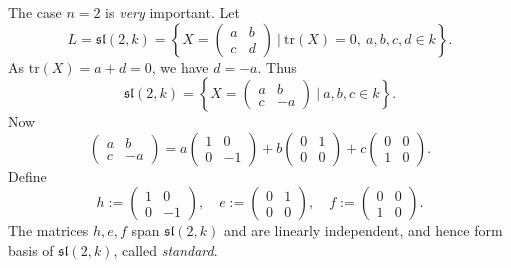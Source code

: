 The case $n = 2$ is \emph{very} important. Let
\[
	L = \mathfrak{sl}(2, k) = \left\{X =
	\begin{pmatrix}
		a & b \\
		c & d
	\end{pmatrix}
	\ |\ \text{tr}(X) = 0,\ a, b, c, d \in k
	\right\}.
\]
As $\text{tr}(X) = a + d = 0$, we have $d = -a$. Thus
\[
	\mathfrak{sl}(2, k) = \left\{X =
	\begin{pmatrix}
		a & b \\
		c & -a
	\end{pmatrix}
	\ |\ a, b, c \in k
	\right\}.
\]
Now
\[
	\begin{pmatrix}
		a & b \\
		c & -a
	\end{pmatrix}
	=
	a\begin{pmatrix}
		1 & 0 \\
		0 & -1
	\end{pmatrix}
	+
	b\begin{pmatrix}
		0 & 1 \\
		0 & 0
	\end{pmatrix}
	+
	c\begin{pmatrix}
		0 & 0 \\
		1 & 0
	\end{pmatrix}.
\]
Define
\[
	h :=
	\begin{pmatrix}
		1 & 0 \\
		0 & -1
	\end{pmatrix}, \quad
	e :=
	\begin{pmatrix}
		0 & 1 \\
		0 & 0
	\end{pmatrix}, \quad
	f :=
	\begin{pmatrix}
		0 & 0 \\
		1 & 0
	\end{pmatrix}.
\]
The matrices $h, e, f$ span $\mathfrak{sl}(2, k)$ and are linearly independent, and hence form basis of $\mathfrak{sl}(2, k)$, called \emph{standard}.

